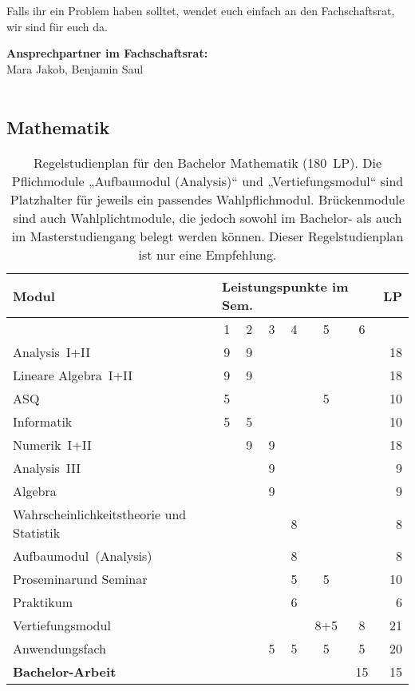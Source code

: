 Falls ihr ein Problem haben solltet, wendet euch einfach an den Fachschaftsrat, wir sind für euch da.

\textbf{Ansprechpartner im Fachschaftsrat:}\\
Mara Jakob, Benjamin Saul\\
\\


    
\subsection{Mathematik}
\label{studiengang_mathematik}

\begin{table}[tbp]
    \begin{small}
    \begin{tabularx}{\textwidth}{|X||c|c|c|c|c|c||r|}
        \hline
        \textbf{Modul}&\multicolumn{6}{l||}{\textbf{Leistungspunkte im Sem.}}&\textbf{LP}\\\hline
        &1&2&3&4&5&6&\\\hline\hline
        Analysis~I+II&9&9&&&&&18\\\hline
        Lineare Algebra~I+II&9&9&&&&&18\\\hline
        ASQ&5&&&&5&&10\\\hline
        Informatik&5&5&&&&&10\\\hline
        Numerik~I+II&&9&9&&&&18\\\hline
        Analysis~III&&&9&&&&9\\\hline
        Algebra&&&9&&&&9\\\hline
        Wahrscheinlichkeitstheorie und Statistik&&&&8&&&8\\\hline
        Aufbaumodul~(Analysis)&&&&8&&&8\\\hline
        Proseminarund Seminar&&&&5&5&&10\\\hline
        Praktikum&&&&6&&&6\\\hline
        Vertiefungsmodul&&&&&8+5&8&21\\\hline
        Anwendungsfach&&&5&5&5&5&20\\\hline\hline
        \textbf{Bachelor-Arbeit}&&&&&&15&15\\\hline\hline
    \end{tabularx}
    \end{small}
    \caption{\label{plan-mathe}Regelstudienplan für den Bachelor Mathematik (180~LP). Die Pflichmodule „Aufbaumodul (Analysis)“ und „Vertiefungsmodul“ sind Platzhalter für jeweils ein passendes Wahlpflichmodul. Brückenmodule sind auch Wahlplichtmodule, die jedoch sowohl im Bachelor- als auch im Masterstudiengang belegt werden können. Dieser Regelstudienplan ist nur eine Empfehlung.}
\end{table}
        
